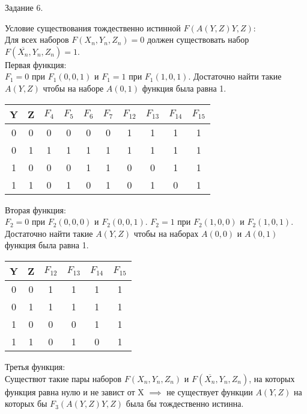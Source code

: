 \documentclass[a4paper,12pt]{report} %
\begin{document}
\bigskip

\begin{center}
	Задание 6.\\
\end{center}
\begin{flushleft}

	Условие существования тождественно истинной $F(A(Y,Z)Y,Z)$:\\
	Для всех наборов $F(X_n,Y_n,Z_n) = 0 $ должен существовать набор $F(\overline{X_n},Y_n,Z_n) = 1$.\\
	Первая функция:\\
	$F_1 = 0$ при $F_1(0,0,1)$ и $F_1 = 1$ при $F_1(1,0,1)$. Достаточно найти такие $A(Y,Z)$ чтобы на наборе $A(0,1)$
	функция была равна 1.\\
	\bigskip
	\begin{tabular}{| c | c | c | c | c | c | c | c | c | c |}
	\hline
	Y & Z & $F_4$ & $F_5$ & $F_6$ & $F_7$ & $F_{12}$ & $F_{13}$ & $F_{14}$ & $F_{15}$\\
	\hline
	0 & 0 & 0 & 0 & 0 & 0 & 1 & 1 & 1 & 1\\
	\hline
	0 & 1 & 1 & 1 & 1 & 1 & 1 & 1 & 1 & 1\\
	\hline
	1 & 0 & 0 & 0 & 1 & 1 & 0 & 0 & 1 & 1\\
	\hline
	1 & 1 & 0 & 1 & 0 & 1 & 0 & 1 & 0 & 1\\
	\hline
	\end{tabular}
	\bigskip
	
	Вторая функция:\\
	$F_2 = 0$ при $F_2(0,0,0)$ и $F_2(0,0,1)$. $F_2 = 1$ при $F_2(1,0,0)$ и $F_2(1,0,1)$. Достаточно найти такие
	$A(Y,Z)$ чтобы на наборах $A(0,0)$ и $A(0,1)$ функция была равна 1.\\
	\bigskip
	\begin{tabular}{| c | c | c | c | c | c |}
	\hline
	Y & Z & $F_{12}$ & $F_{13}$ & $F_{14}$ & $F_{15}$\\
	\hline
	0 & 0 & 1 & 1 & 1 & 1\\
	\hline
	0 & 1 & 1 & 1 & 1 & 1\\
	\hline
	1 & 0 & 0 & 0 & 1 & 1\\
	\hline
	1 & 1 & 0 & 1 & 0 & 1\\
	\hline
	\end{tabular}
	\bigskip

	Третья функция:\\
	Существют такие пары наборов $F(X_n,Y_n,Z_n)$ и $F(\overline{X_n},Y_n,Z_n)$, на которых функция равна нулю и не завист от X $\implies$ не существует функции $A(Y,Z)$ на которых бы $F_3(A(Y,Z)Y,Z)$ была бы тождественно истинна.\\
\end{flushleft}
\end{document}
